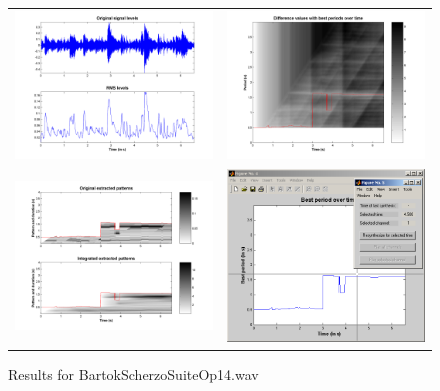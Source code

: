 
\begin{figure}[p]
    \begin{tabular}{cc}
        \includegraphics[width=7.5cm]{Graphics/MECDemoBartokScherzoSuiteOp14RMS} & \includegraphics[width=7.5cm]{Graphics/MECDemoBartokScherzoSuiteOp14Values}\\
        \includegraphics[width=7.5cm]{Graphics/MECDemoBartokScherzoSuiteOp14IntegrPatt} & \includegraphics[width=7.5cm]{Graphics/MECDemoBartokScherzoSuiteOp14UI}\\
    \end{tabular}
    \caption{Results for BartokScherzoSuiteOp14.wav}
    \label{Fig:MECBartokExample}
\end{figure}

